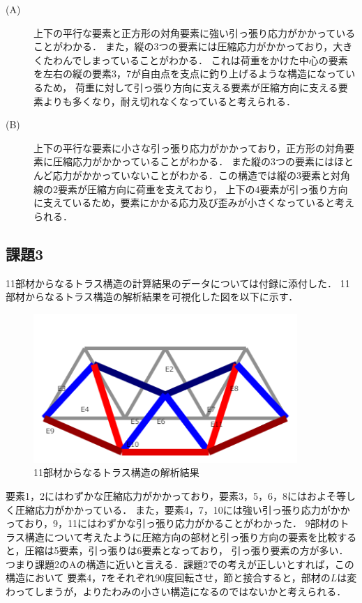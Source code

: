 \documentclass[a4paper,11pt,uplatex]{jsarticle}
\begin{document}
\begin{description}
  \item[(A)]上下の平行な要素と正方形の対角要素に強い引っ張り応力がかかっていることがわかる．
  また，縦の3つの要素には圧縮応力がかかっており，大きくたわんでしまっていることがわかる．
  これは荷重をかけた中心の要素を左右の縦の要素3，7が自由点を支点に釣り上げるような構造になっているため，
  荷重に対して引っ張り方向に支える要素が圧縮方向に支える要素よりも多くなり，耐え切れなくなっていると考えられる．

  \item[(B)]上下の平行な要素に小さな引っ張り応力がかかっており，正方形の対角要素に圧縮応力がかかっていることがわかる．
  また縦の3つの要素にはほとんど応力がかかっていないことがわかる．この構造では縦の3要素と対角線の2要素が圧縮方向に荷重を支えており，
  上下の4要素が引っ張り方向に支えているため，要素にかかる応力及び歪みが小さくなっていると考えられる．

\end{description}

\subsection{課題3}
11部材からなるトラス構造の計算結果のデータについては付録に添付した．
11部材からなるトラス構造の解析結果を可視化した図を以下に示す．

\begin{figure}[H]
  \begin{center}
    \includegraphics[width = 10cm]{画像/11.png}
    \caption{11部材からなるトラス構造の解析結果}
    \label{11解析}
  \end{center}
\end{figure}


要素1，2にはわずかな圧縮応力がかかっており，要素3，5，6，8にはおよそ等しく圧縮応力がかかっている．
また，要素4，7，10には強い引っ張り応力がかかっており，9，11にはわずかな引っ張り応力がかることがわかった．
9部材のトラス構造について考えたように圧縮方向の部材と引っ張り方向の要素を比較すると，圧縮は5要素，引っ張りは6要素となっており，
引っ張り要素の方が多い．つまり課題2のAの構造に近いと言える．課題2での考えが正しいとすれば，この構造において
要素4，7をそれぞれ90度回転させ，節と接合すると，部材の$L$は変わってしまうが，よりたわみの小さい構造になるのではないかと考えられる．
\end{document}
